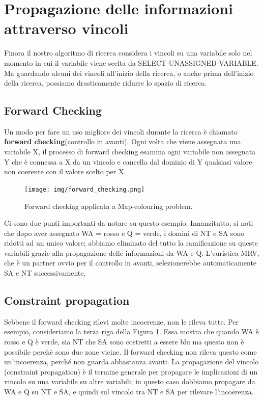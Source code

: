 \section{Propagazione delle informazioni attraverso vincoli}
Finora il nostro algoritmo di ricerca considera i vincoli su una variabile solo nel momento in cui il variabile viene scelta da SELECT-UNASSIGNED-VARIABLE. Ma guardando alcuni dei
vincoli all'inizio della ricerca, o anche prima dell'inizio della ricerca, possiamo drasticamente ridurre lo spazio di ricerca.

\subsection{Forward Checking}

Un modo per fare un uso migliore dei vincoli durante la ricerca è chiamato \textbf{forward checking}(controllo in avanti). Ogni volta che viene assegnata una variabile X, il processo di forward checking esamina ogni variabile non assegnata Y che è connessa a X da un vincolo e cancella dal dominio di Y qualsiasi valore non coerente con il valore scelto per X.
\begin{figure}[H]
    \centering
    \texttt{[image: img/forward\_checking.png]}
    \caption{Forward checking applicata a Map-colouring problem.}\label{fig:forward_checking}
\end{figure}

Ci sono due punti importanti da notare su questo esempio. Innanzitutto, si noti che dopo aver assegnato WA = rosso e Q = verde, i domini di NT e SA
sono ridotti ad un unico valore; abbiamo eliminato del tutto la ramificazione su queste variabili grazie alla propagazione delle informazioni da WA e Q. L'euristica MRV, che è un partner ovvio per il controllo in avanti, selezionerebbe automaticamente SA e NT successivamente.

\subsection{Constraint propagation}
Sebbene il forward checking rilevi molte incoerenze, non le rileva tutte. Per esempio, consideriamo la terza riga della Figura \ref{fig:forward_checking}. Essa mostra che quando WA è rosso e Q è verde, sia NT che SA sono costretti a essere blu ma questo non è possibile perchè sono due zone vicine. Il forward checking non rileva questo come un'incoerenza, perché non guarda abbastanza avanti. La propagazione del vincolo (constraint propagation) è il termine generale per propagare le implicazioni di un vincolo su una variabile su altre variabili; in questo caso dobbiamo propagare da WA e Q su NT e SA, e quindi sul vincolo tra NT e SA per rilevare l'incoerenza. 

